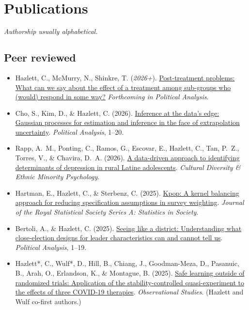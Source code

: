\documentclass[11pt]{article}
\newcommand{\pubitem}[1]{\item #1}
\begin{document}
\section{Publications}
\emph{Authorship usually alphabetical.}

\subsection{Peer reviewed}
\begin{itemize}
\pubitem{Hazlett, C., McMurry, N., Shinkre, T. (\textit{2026+}). \href{https://chadhazlett.com/publications.html#hazlett_mcmurry_shinkre_2026_posttreatment}{Post-treatment problems: What can we say about the effect of a treatment among sub-groups who (would) respond in some way?} \textit{Forthcoming in Political Analysis}.}

\pubitem{Cho, S., Kim, D., \& Hazlett, C. (2026). \href{https://chadhazlett.com/publications.html#cho_kim_hazlett_2026_gp}{Inference at the data's edge: Gaussian processes for estimation and inference in the face of extrapolation uncertainty}. \textit{Political Analysis}, 1--20.}

\pubitem{Rapp, A.~M., Ponting, C., Ramos, G., Escovar, E., Hazlett, C., Tan, P.~Z., Torres, V., \& Chavira, D.~A. (2026). \href{https://chadhazlett.com/publications.html#rapp_2026_depression_latine}{A data-driven approach to identifying determinants of depression in rural Latine adolescents}. \textit{Cultural Diversity \& Ethnic Minority Psychology}.}

\pubitem{Hartman, E., Hazlett, C., \& Sterbenz, C. (2025). \href{https://chadhazlett.com/publications.html#hartman_hazlett_sterbenz_2025_kpop}{Kpop: A kernel balancing approach for reducing specification assumptions in survey weighting}. \textit{Journal of the Royal Statistical Society Series A: Statistics in Society}.}

\pubitem{Bertoli, A., \& Hazlett, C. (2025). \href{https://chadhazlett.com/publications.html#bertoli_hazlett_2025_seeing_like_district}{Seeing like a district: Understanding what close-election designs for leader characteristics can and cannot tell us}. \textit{Political Analysis}, 1--19.}

\pubitem{Hazlett*, C., Wulf*, D., Hill, B., Chiang, J., Goodman-Meza, D., Pasanuic, B., Arah, O., Erlandson, K., \& Montague, B. (2025). \href{https://chadhazlett.com/publications.html#hazlett_wulf_2025_scqe_covid}{Safe learning outside of randomized trials: Application of the stability-controlled quasi-experiment to the effects of three COVID-19 therapies}. \textit{Observational Studies}. (Hazlett and Wulf co-first authors.)}


\end{itemize}
\end{document}
